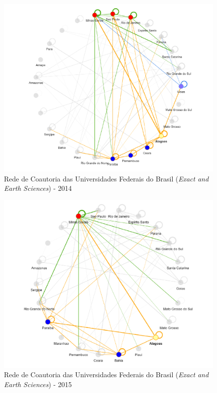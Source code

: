 \begin{figure}[H]
	\centering
	\includegraphics[scale=0.6]{Imagens/rede-exact-AL-2014.pdf}
	\caption{Rede de Coautoria das Universidades Federais do Brasil (\textit{Exact and Earth Sciences}) - 2014}
	\label{Rede de Coautoria - UF EXACT AL 2014}
\end{figure}


\begin{figure}[H]
	\centering
	\includegraphics[scale=0.6]{Imagens/rede-exact-AL-2015.pdf}
	\caption{Rede de Coautoria das Universidades Federais do Brasil (\textit{Exact and Earth Sciences}) - 2015}
	\label{Rede de Coautoria - UF EXACT AL 2015}
\end{figure}

